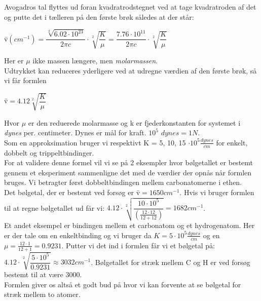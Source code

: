 Avogadros tal flyttes ud foran kvadratrodstegnet ved at tage kvadratroden af det og putte det i tælleren på den første brøk således at der står:

\begin{center}
\={v}$(cm^{-1})=\dfrac{\sqrt[2]{6.02 \cdot 10^{23}}}{2 \pi c} \cdot \sqrt[2]{\dfrac{K}{\mu}} = \dfrac{7.76 \cdot 10^{11}}{2 \pi c} \cdot \sqrt[2]{\dfrac{K}{\mu}}$
\end{center}

Her er $\mu$ ikke massen længere, men \emph{molarmassen}.
\\

Udtrykket kan reduceres yderligere ved at udregne værdien af den  første brøk, så vi får formlen

\begin{center}
\={v}$=4.12 \sqrt[2]{\dfrac{K}{\mu}}$
\end{center}

Hvor $\mu$ er den reduerede molarmasse og k er fjederkonstanten for systemet i \emph{dynes} per. centimeter. Dynes er mål for kraft. $10^5$  $dynes = 1N$.
\\

Som en approksimation bruger vi respektivt K = 5, 10, 15 $\cdot 10^5 \frac{dynes}{cm}$ for enkelt, dobbelt og trippeltbindinger.
\\

For at validere denne formel vil vi se på 2 eksempler hvor bølgetallet er bestemt gennem et eksperiment sammenligne det med de værdier der opnås når formlen bruges. Vi betragter først dobbeltbindingen mellem carbonatomerne i ethen.
\\

Det bølgetal, der er bestemt ved forsøg er \={v}$=1650cm^{-1}$. Hvis vi bruger formlen til at regne bølgetallet ud får vi: $4.12 \cdot \sqrt[2]{\dfrac{10 \cdot 10^5}{(\frac{12 \cdot 12}{12 +12})}} = 1682 cm^{-1}$. 
\\

Et andet eksempel er bindingen mellem et carbonatom og et hydrogenatom. Her er der tale om en enkeltbinding og vi bruger da $K=5 \cdot 10^5 \frac{dynes}{cm}$ og en $\mu = \frac{12 \cdot 1}{12 + 1} = 0.9231$. Putter vi det ind i formlen får vi et bølgetal på: $4.12 \cdot \sqrt[2]{\dfrac{5 \cdot 10^5}{0.9231}} \approx 3032 cm^{-1}$. Bølgetallet for stræk mellem C og H er ved forsøg bestemt til at være 3000. 
\\

Formlen giver os altså et godt bud på hvor vi kan forvente at se bølgetal for stræk mellem to atomer.
\\

